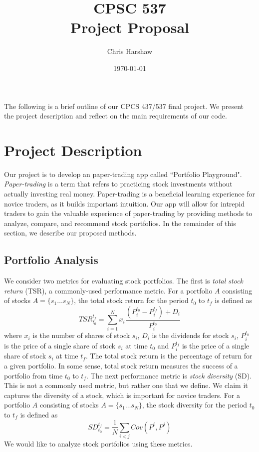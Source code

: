 \documentclass{article}
\begin{document}
\title{CPSC 537  \\ Project Proposal}
\author{Chris Harshaw}
\date{\today}
\maketitle

\pagestyle{fancy}
\fancyhf{}
\rfoot{\thepage}

The following is a brief outline of our CPCS 437/537 final project. We present the project description and reflect on the main requirements of our code.

\section{Project Description}
Our project is to develop an paper-trading app called ``Portfolio Playground". \emph{Paper-trading} is a term that refers to practicing stock investments without actually investing real money. Paper-trading is a beneficial learning experience for novice traders, as it builds important intuition. Our app will allow for intrepid traders to gain the valuable experience of paper-trading by providing methods to analyze, compare, and recommend stock portfolios. In the remainder of this section, we describe our proposed methods.

\subsection{Portfolio Analysis}
We consider two metrics for evaluating stock portfolios. The first is \emph{total stock return} (TSR), a commonly-used performance metric. For a portfolio $A$ consisting of stocks $A = \{s_1\dots s_N\}$, the total stock return for the period $t_0$ to $t_f$ is defined as
$$ TSR_{t_0}^{t_f} = \sum_{i=1}^N x_i \frac{(P^{t_0}_{i} - P^{t_f}_{i}) + D_i}{P^{t_0}_{i}} $$
where $x_i$ is the number of shares of stock $s_i$, $D_i$ is the dividends for stock $s_i$, $P^{t_0}_{i}$ is the price of a single share of stock $s_i$ at time $t_0$ and $P^{t_f}_{i}$ is the price of a single share of stock $s_i$ at time $t_f$. The total stock return is the percentage of return for a given portfolio. In some sense, total stock return measures the success of a portfolio from time $t_0$ to $t_f$. The next performance metric is \emph{stock diversity} (SD). This is not a commonly used metric, but rather one that we define. We claim it captures the diversity of a stock, which is important for novice traders. For a portfolio $A$ consisting of stocks $A = \{s_1\dots s_N\}$, the stock diversity for the period $t_0$ to $t_f$ is defined as 
$$ SD_{t_0}^{t_f} = \frac{1}{N}\sum_{i<j} Cov(P^i, P^j) $$
We would like to analyze stock portfolios using these metrics.
\end{document}
